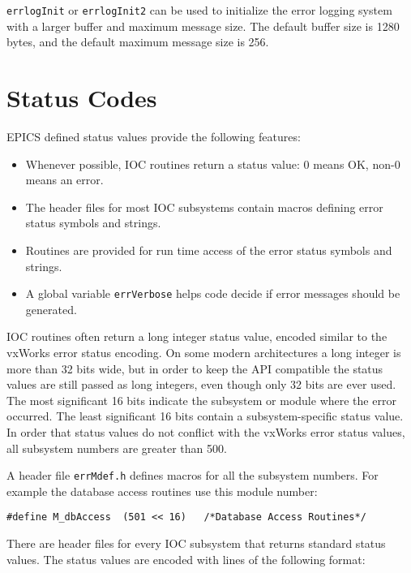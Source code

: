 \verb|errlogInit| or \verb|errlogInit2| can be used to initialize the error logging system with a larger buffer and maximum message size.
The default buffer size is 1280 bytes, and the default maximum message size is 256.

\section{Status Codes}

EPICS defined status values provide the following features:

\begin{itemize}
\item Whenever possible, IOC routines return a status value:
0 means OK, non-0 means an error.

\item The header files for most IOC subsystems contain macros defining error status symbols and strings.

\item Routines are provided for run time access of the error status symbols and strings.

\item A global variable \verb|errVerbose| helps code decide if error messages should be generated.

\end{itemize}

IOC routines often return a long integer status value, encoded similar to the vxWorks error status encoding.
On some modern architectures a long integer is more than 32 bits wide, but in order to keep the API compatible the status values are still passed as long integers, even though only 32 bits are ever used.
The most significant 16 bits indicate the subsystem or module where the error occurred.
The least significant 16 bits contain a subsystem-specific status value.
In order that status values do not conflict with the vxWorks error status values, all subsystem numbers are greater than 500.

A header file \verb|errMdef.h| defines macros for all the subsystem numbers.
For example the database access routines use this module number:

\begin{verbatim}
#define M_dbAccess  (501 << 16)   /*Database Access Routines*/
\end{verbatim}

There are header files for every IOC subsystem that returns standard status values.
The status values are encoded with lines of the following format:

